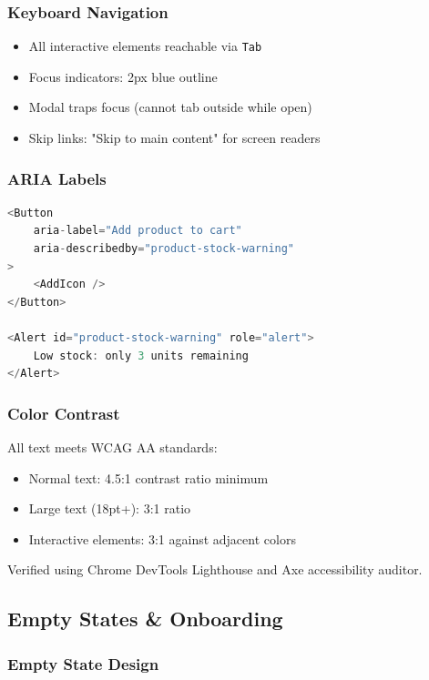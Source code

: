 \subsubsection{Keyboard Navigation}

\begin{itemize}
    \item All interactive elements reachable via \texttt{Tab}
    \item Focus indicators: 2px blue outline
    \item Modal traps focus (cannot tab outside while open)
    \item Skip links: "Skip to main content" for screen readers
\end{itemize}

\subsubsection{ARIA Labels}

\begin{lstlisting}[language=JavaScript,label=lst:aria-labels]
<Button
    aria-label="Add product to cart"
    aria-describedby="product-stock-warning"
>
    <AddIcon />
</Button>

<Alert id="product-stock-warning" role="alert">
    Low stock: only 3 units remaining
</Alert>
\end{lstlisting}

\subsubsection{Color Contrast}

All text meets WCAG AA standards:

\begin{itemize}
    \item Normal text: 4.5:1 contrast ratio minimum
    \item Large text (18pt+): 3:1 ratio
    \item Interactive elements: 3:1 against adjacent colors
\end{itemize}

Verified using Chrome DevTools Lighthouse and Axe accessibility auditor.

\subsection{Empty States \& Onboarding}

\subsubsection{Empty State Design}


